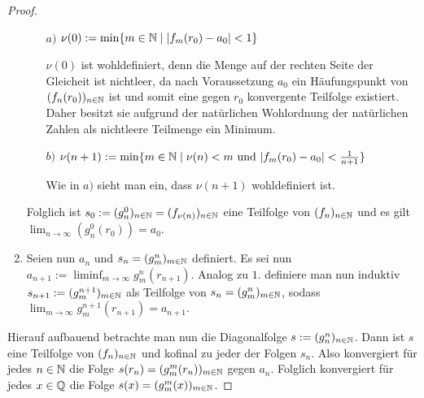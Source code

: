 \begin{proof}
\begin{enumerate}
\begin{itemize}
        \item[$a)$] $\nu(0) := \min\{m \in \mathbb{N} \mid |f_m(r_0) - a_0 | < 1\}$

          $\nu(0)$ ist wohldefiniert, denn die Menge auf der rechten Seite der Gleicheit ist nichtleer, da nach Voraussetzung $a_0$ ein Häufungspunkt von $(f_n(r_0))_{n \in \mathbb{N}}$ ist und somit eine gegen $r_0$ konvergente Teilfolge existiert.
          Daher besitzt sie aufgrund der natürlichen Wohlordnung der natürlichen Zahlen als nichtleere Teilmenge ein Minimum.

        \item[$b)$] $\nu(n+1) :=  \min\{m \in \mathbb{N} \mid \nu(n) < m \text{ und }  |f_m(r_0) - a_0| < \frac{1}{n+1}\}$

          Wie in $a)$ sieht man ein, dass $\nu(n+1)$ wohldefiniert ist.
      \end{itemize}
      Folglich ist $s_0:= (g_n^0)_{n \in \mathbb{N}} = (f_{\nu(n)})_{n \in \mathbb{N}}$ eine Teilfolge von $(f_n)_{n \in \mathbb{N}}$ und es gilt $\lim_{n \to \infty}(g_n^0(r_0)) = a_0$.

    \item 
      Seien nun $a_n$ und $s_n = (g_m^n)_{m \in \mathbb{N}}$ definiert.
      Es sei nun $a_{n + 1} := \liminf_{m \to \infty} g_m^n(r_{n+1})$.
      Analog zu $1.$ definiere man nun induktiv $s_{n+1} := (g_m^{n + 1})_{m \in \mathbb{N}}$ als Teilfolge von $s_n = (g_m^n)_{m \in \mathbb{N}}$, sodass $\lim_{m \to \infty} g_m^{n + 1}(r_{n+1}) = a_{n + 1}$.
  \end{enumerate}

  Hierauf aufbauend betrachte man nun die Diagonalfolge $s := (g_n^n)_{n \in \mathbb{N}}$.
  Dann ist $s$ eine Teilfolge von $(f_n)_{n \in \mathbb{N}}$ und kofinal zu jeder der Folgen $s_n$.
  Also konvergiert für jedes $n \in \mathbb{N}$ die Folge $s(r_n) = (g_m^m(r_n))_{m \in \mathbb{N}}$ gegen $a_n$.
  Folglich konvergiert für jedes $x \in \mathbb{Q}$ die Folge $s(x) = (g_m^m(x))_{m \in \mathbb{N}}$.


\end{proof}
